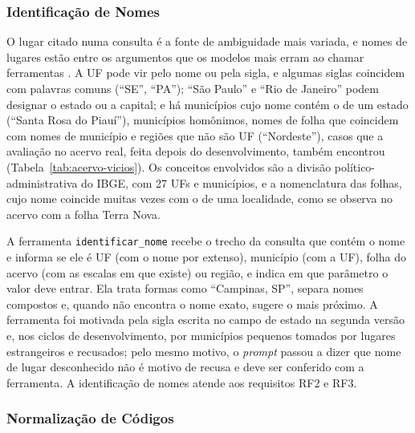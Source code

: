 \subsubsection{Identificação de Nomes}
\label{sec:identificar-nome}

O lugar citado numa consulta é a fonte de ambiguidade mais variada, e nomes de lugares estão entre os argumentos que os modelos mais erram ao chamar ferramentas \cite{lu2025toolsandbox}. A UF pode vir pelo nome ou pela sigla, e algumas siglas coincidem com palavras comuns (``SE'', ``PA''); ``São Paulo'' e ``Rio de Janeiro'' podem designar o estado ou a capital; e há municípios cujo nome contém o de um estado (``Santa Rosa do Piauí''), municípios homônimos, nomes de folha que coincidem com nomes de município e regiões que não são UF (``Nordeste''), casos que a avaliação no acervo real, feita depois do desenvolvimento, também encontrou (Tabela~\ref{tab:acervo-vicios}). Os conceitos envolvidos são a divisão político-administrativa do IBGE, com 27 UFs e  municípios, e a nomenclatura das folhas, cujo nome coincide muitas vezes com o de uma localidade, como se observa no acervo com a folha Terra Nova.

A ferramenta \texttt{identificar\_nome} recebe o trecho da consulta que contém o nome e informa se ele é UF (com o nome por extenso), município (com a UF), folha do acervo (com as escalas em que existe) ou região, e indica em que parâmetro o valor deve entrar. Ela trata formas como ``Campinas, SP'', separa nomes compostos e, quando não encontra o nome exato, sugere o mais próximo. A ferramenta foi motivada pela sigla escrita no campo de estado na segunda versão e, nos ciclos de desenvolvimento, por municípios pequenos tomados por lugares estrangeiros e recusados; pelo mesmo motivo, o \textit{prompt} passou a dizer que nome de lugar desconhecido não é motivo de recusa e deve ser conferido com a ferramenta. A identificação de nomes atende aos requisitos RF2 e RF3.

\subsubsection{Normalização de Códigos}
\label{sec:normalizar-codigo}

